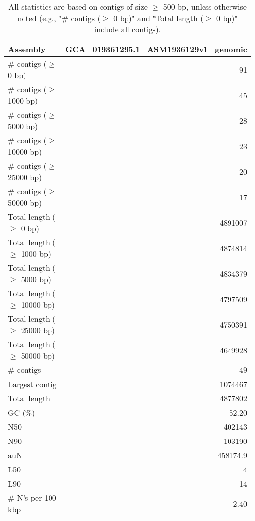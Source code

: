 \documentclass[12pt,a4paper]{article}
\begin{document}
\begin{table}[ht]
\begin{center}
\caption{All statistics are based on contigs of size $\geq$ 500 bp, unless otherwise noted (e.g., "\# contigs ($\geq$ 0 bp)" and "Total length ($\geq$ 0 bp)" include all contigs).}
\begin{tabular}{|l*{1}{|r}|}
\hline
Assembly & GCA\_019361295.1\_ASM1936129v1\_genomic \\ \hline
\# contigs ($\geq$ 0 bp) & 91 \\ \hline
\# contigs ($\geq$ 1000 bp) & 45 \\ \hline
\# contigs ($\geq$ 5000 bp) & 28 \\ \hline
\# contigs ($\geq$ 10000 bp) & 23 \\ \hline
\# contigs ($\geq$ 25000 bp) & 20 \\ \hline
\# contigs ($\geq$ 50000 bp) & 17 \\ \hline
Total length ($\geq$ 0 bp) & 4891007 \\ \hline
Total length ($\geq$ 1000 bp) & 4874814 \\ \hline
Total length ($\geq$ 5000 bp) & 4834379 \\ \hline
Total length ($\geq$ 10000 bp) & 4797509 \\ \hline
Total length ($\geq$ 25000 bp) & 4750391 \\ \hline
Total length ($\geq$ 50000 bp) & 4649928 \\ \hline
\# contigs & 49 \\ \hline
Largest contig & 1074467 \\ \hline
Total length & 4877802 \\ \hline
GC (\%) & 52.20 \\ \hline
N50 & 402143 \\ \hline
N90 & 103190 \\ \hline
auN & 458174.9 \\ \hline
L50 & 4 \\ \hline
L90 & 14 \\ \hline
\# N's per 100 kbp & 2.40 \\ \hline
\end{tabular}
\end{center}
\end{table}
\end{document}
